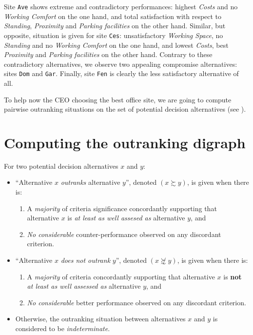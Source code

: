 Site \texttt{Ave} shows extreme and contradictory performances: highest \emph{Costs} and no \emph{Working Comfort} on the one hand, and total satisfaction with respect to \emph{Standing}, \emph{Proximity} and \emph{Parking facilities} on the other hand. Similar, but opposite, situation is given for site \texttt{Ces}: unsatisfactory \emph{Working Space}, no \emph{Standing} and no \emph{Working Comfort} on the one hand, and lowest \emph{Costs}, best \emph{Proximity} and \emph{Parking facilities} on the other hand. Contrary to these contradictory alternatives, we observe two appealing compromise alternatives: sites \texttt{Dom} and \texttt{Gar}. Finally, site \texttt{Fen} is clearly the less satisfactory alternative of all.

To help now the CEO choosing the best office site, we are going to compute pairwise outranking situations on the set of potential decision alternatives (see \citet{BIS-2013}).

\section{Computing the outranking digraph}
\label{sec:4.3}

\begin{definition}\label{def:outranking}

\noindent For two potential decision alternatives $x$ and $y$:
\begin{itemize}[leftmargin=0.5cm,rightmargin=0.5cm]
\item ``Alternative $x$ \emph{outranks} alternative $y$'', denoted $(x \succsim y)$, is given when there is:
   \begin{enumerate}
     \item A \emph{majority} of criteria significance concordantly supporting that alternative $x$ is \emph{at least as well assesed as} alternative $y$, and
     \item \emph{No considerable} counter-performance observed on any discordant criterion.      
    \end{enumerate}
\item ``Alternative $x$ \emph{does not outrank} $y$'', denoted $(x \not\succsim y)$, is given when there is:
   \begin{enumerate}
    \item A \emph{majority} of criteria concordantly supporting that alternative $x$ is \textbf{not} \emph{at least as well assessed as} alternative $y$, and
    \item \emph{No considerable} better performance observed on any discordant criterion. 
    \end{enumerate}
\item Otherwise, the outranking situation between alternatives $x$ and $y$ is considered to be \emph{indeterminate}.
\end{itemize}
\end{definition}

